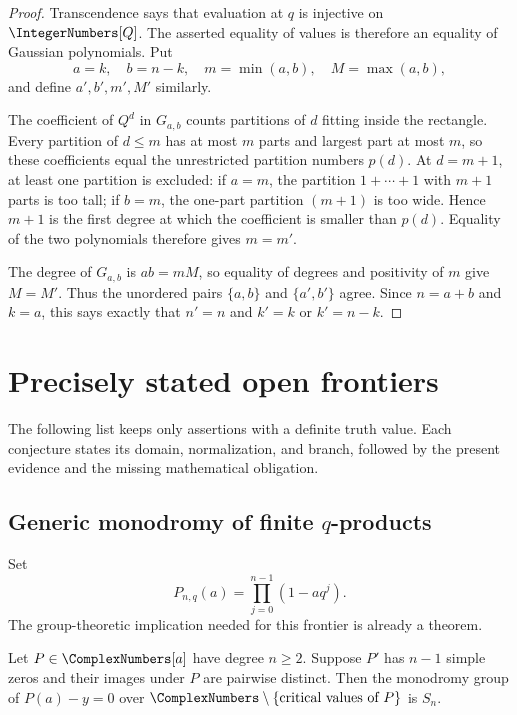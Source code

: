 \begin{proof}
Transcendence says that evaluation at \(q\) is injective on
\(\IntegerNumbers[Q]\).  The asserted equality of values is therefore an equality of
Gaussian polynomials.  Put
\[
 a=k,\quad b=n-k,\quad
 m=\min(a,b),\quad M=\max(a,b),
\]
and define \(a',b',m',M'\) similarly.

The coefficient of \(Q^d\) in \(G_{a,b}\) counts partitions of \(d\) fitting
inside the rectangle.  Every partition of \(d\le m\) has at most \(m\) parts
and largest part at most \(m\), so these coefficients equal the unrestricted
partition numbers \(p(d)\).  At \(d=m+1\), at least one partition is excluded:
if \(a=m\), the partition \(1+\cdots+1\) with \(m+1\) parts is too tall; if
\(b=m\), the one-part partition \((m+1)\) is too wide.  Hence \(m+1\) is the
first degree at which the coefficient is smaller than \(p(d)\).  Equality of
the two polynomials therefore gives \(m=m'\).

The degree of \(G_{a,b}\) is \(ab=mM\), so equality of degrees and positivity
of \(m\) give \(M=M'\).  Thus the unordered pairs
\(\{a,b\}\) and \(\{a',b'\}\) agree.  Since \(n=a+b\) and \(k=a\), this says
exactly that \(n'=n\) and \(k'=k\) or \(k'=n-k\).
\end{proof}

\section{Precisely stated open frontiers}
\label{sec:precise-open-frontiers}

The following list keeps only assertions with a definite truth value.  Each
conjecture states its domain, normalization, and branch, followed by the
present evidence and the missing mathematical obligation.

\subsection{\texorpdfstring{Generic monodromy of finite \(q\)-products}{Generic monodromy of finite q-products}}

Set
\[
 P_{n,q}(a)=\prod_{j=0}^{n-1}(1-aq^j).
\]
The group-theoretic implication needed for this frontier is already a
theorem.

\begin{theorem}
\label{thm:simple-critical-values-monodromy}
Let \(P\in\ComplexNumbers[a]\) have degree \(n\ge2\).  Suppose \(P'\) has \(n-1\)
simple zeros and their images under \(P\) are pairwise distinct.  Then the
monodromy group of \(P(a)-y=0\) over
\(\ComplexNumbers\setminus\{\text{critical values of }P\}\) is \(S_n\).
\end{theorem}

